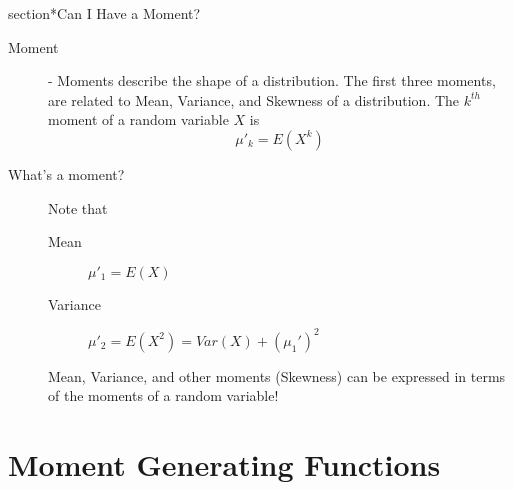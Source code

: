 \documentclass[11pt]{article}
\begin{document}
section*{Can I Have a Moment?}
\begin{description}
\item[Moment] - Moments describe the shape of a distribution. The first three moments, are related to Mean, Variance, and Skewness of a distribution. The $k^{th}$ moment of a random variable $X$ is
  \[\mu'_k = E(X^k)\]
\item[What's a moment?] Note that
  \begin{description}
    \item[Mean] $\mu'_1 = E(X)$
    \item[Variance] $\mu'_2 = E(X^2) = Var(X) + (\mu_1')^2$
  \end{description}
  Mean, Variance, and other moments (Skewness) can be expressed in terms of the moments of a random variable!
\end{description}

\section*{Moment Generating Functions}
\end{document}
